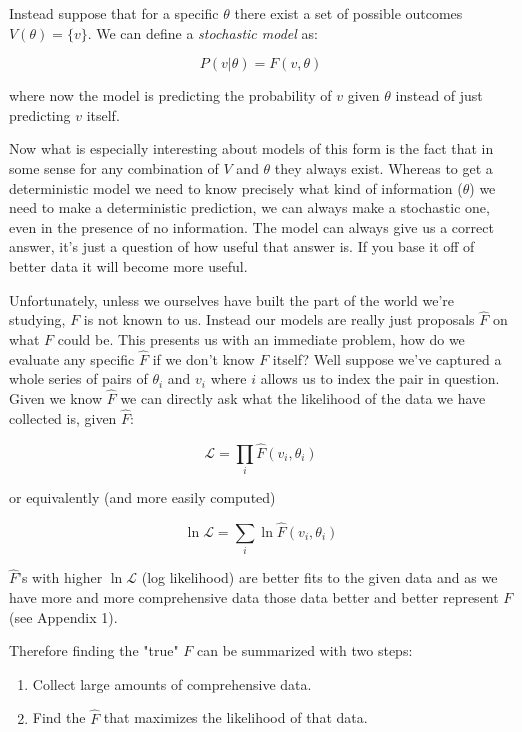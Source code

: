 \documentclass[11pt]{article}
\begin{document}
Instead suppose that for a specific $\theta$ there exist a set of possible outcomes $V(\theta)=\lbrace v \rbrace$. We can define a \textit{stochastic model} as:

$$P(v|\theta)=F(v, \theta)$$ 

where now the model is predicting the probability of $v$ given $\theta$ instead of just predicting $v$ itself.

Now what is especially interesting about models of this form is the fact that in some sense for any combination of $V$ and $\theta$ they always exist. Whereas to get a deterministic model we need to know precisely what kind of information ($\theta$) we need to make a deterministic prediction, we can always make a stochastic one, even in the presence of no information. The model can always give us a correct answer, it's just a question of how useful that answer is. If you base it off of better data it will become more useful.

Unfortunately, unless we ourselves have built the part of the world we're studying, $F$ is not known to us. Instead our models are really just proposals $\hat{F}$ on what $F$ could be. This presents us with an immediate problem, how do we evaluate any specific $\hat{F}$ if we don't know $F$ itself? Well suppose we've captured a whole series of pairs of $\theta_i$ and $v_i$ where $i$ allows us to index the pair in question. Given we know $\hat{F}$ we can directly ask what the likelihood of the data we have collected is, given $\hat{F}$:

$$\mathcal{L}=\prod_i \hat{F}(v_i, \theta_i)$$

or equivalently (and more easily computed)

$$\ln \mathcal{L} = \sum_i \ln \hat{F}(v_i, \theta_i)$$

$\hat{F}$'s with higher $\ln \mathcal{L}$ (log likelihood) are better fits to the given data and as we have more and more comprehensive data those data better and better represent $F$ (see Appendix 1).

Therefore finding the "true" $F$ can be summarized with two steps:

\begin{enumerate}
\item Collect large amounts of comprehensive data.
\item Find the $\hat{F}$ that maximizes the likelihood of that data.
\end{enumerate}
\end{document}
